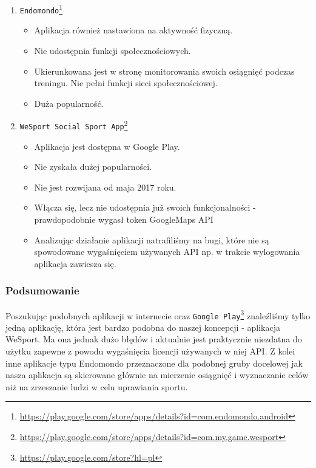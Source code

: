 \documentclass[12pt,a4paper]{report}
\begin{document}
\begin{enumerate}

\item \texttt{Endomondo}\footnote{\url{https://play.google.com/store/apps/details?id=com.endomondo.android}}
\begin{itemize}
\item Aplikacja również nastawiona na aktywność fizyczną.
\item Nie udostępnia funkcji społecznościowych.
\item Ukierunkowana jest w stronę monitorowania swoich osiągnięć podczas treningu. Nie pełni funkcji sieci społecznościowej.
\item Duża popularność.
\end{itemize}

\item \texttt{WeSport Social Sport App}\footnote{\url{https://play.google.com/store/apps/details?id=com.my.game.wesport}}
\begin{itemize}
\item Aplikacja jest dostępna w Google Play. 
\item Nie zyskała dużej popularności. 
\item Nie jest rozwijana od maja 2017 roku. 
\item Włącza się, lecz nie udostępnia już swoich funkcjonalności - prawdopodobnie wygasł token GoogleMaps API
\item Analizując działanie aplikacji natrafiliśmy na bugi, które nie są spowodowane wygaśnięciem używanych API np. w trakcie wylogowania aplikacja zawiesza się.
\end{itemize}

\end{enumerate}

\subsubsection{Podsumowanie}

Poszukując podobnych aplikacji w internecie oraz \texttt{Google Play}\footnote{\url{https://play.google.com/store?hl=pl}} znaleźliśmy tylko jedną aplikację, która jest bardzo podobna do naszej koncepcji - aplikacja WeSport. Ma ona jednak dużo błędów i aktualnie jest praktycznie niezdatna do użytku zapewne z powodu wygaśnięcia licencji używanych w niej API. Z kolei inne aplikacje typu Endomondo przeznaczone dla podobnej gruby docelowej jak nasza aplikacja są skierowane głównie na mierzenie osiągnięć i wyznaczanie celów niż na zrzeszanie ludzi w celu uprawiania sportu.
\end{document}
